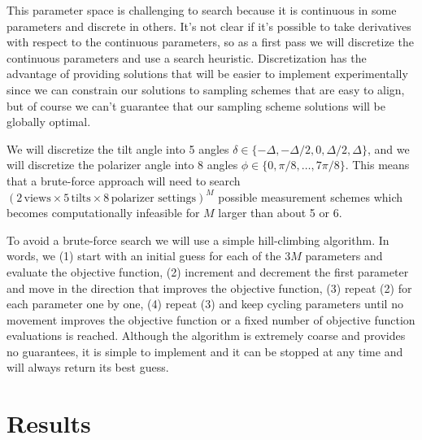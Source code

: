 \documentclass[11pt]{article}
\begin{document}
This parameter space is challenging to search because it is continuous in some
parameters and discrete in others. It's not clear if it's possible to take
derivatives with respect to the continuous parameters, so as a first pass we
will discretize the continuous parameters and use a search heuristic.
Discretization has the advantage of providing solutions that will be easier to
implement experimentally since we can constrain our solutions to sampling
schemes that are easy to align, but of course we can't guarantee that our
sampling scheme solutions will be globally optimal.

We will discretize the tilt angle into 5 angles
$\delta \in \{-\Delta, -\Delta/2, 0,\Delta/2, \Delta\}$, and we will discretize
the polarizer angle into 8 angles $\phi \in \{0,\pi/8,\dots,7\pi/8\}$. This means
that a brute-force approach will need to search
$(2\,\text{views}\times 5\,\text{tilts}\times 8\,\text{polarizer settings})^M$
possible measurement schemes which becomes computationally infeasible for $M$
larger than about 5 or 6.

To avoid a brute-force search we will use a simple hill-climbing algorithm. In
words, we (1) start with an initial guess for each of the $3M$ parameters and
evaluate the objective function, (2) increment and decrement the first parameter
and move in the direction that improves the objective function, (3) repeat (2)
for each parameter one by one, (4) repeat (3) and keep cycling parameters until
no movement improves the objective function or a fixed number of objective
function evaluations is reached. Although the algorithm is extremely coarse and
provides no guarantees, it is simple to implement and it can be stopped at any
time and will always return its best guess.

\section{Results}
\end{document}
